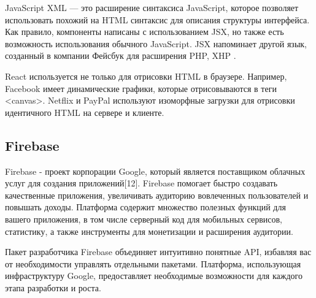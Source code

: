 JavaScript XML — это расширение синтаксиса JavaScript, которое позволяет использовать похожий на HTML синтаксис для описания структуры интерфейса.
Как правило, компоненты написаны с использованием JSX, но также есть возможность использования обычного JavaScript.
JSX напоминает другой язык, созданный в компании Фейсбук для расширения PHP, XHP .

React используется не только для отрисовки HTML в браузере.
Например, Facebook имеет динамические графики, которые отрисовываются в теги <canvas>.
Netflix и PayPal используют изоморфные загрузки для отрисовки идентичного HTML на сервере и клиенте.

\subsection{Firebase}
Firebase - проект корпорации Google, который является поставщиком облачных услуг для создания приложений[12].
Firebase помогает быстро создавать качественные приложения, увеличивать аудиторию вовлеченных пользователей и повышать доходы.
Платформа содержит множество полезных функций для вашего приложения, в том числе серверный код для мобильных сервисов, статистику, а также инструменты для монетизации и расширения аудитории.

Пакет разработчика Firebase объединяет интуитивно понятные API, избавляя вас от необходимости управлять отдельными пакетами.
Платформа, использующая инфраструктуру Google, предоставляет необходимые возможности для каждого этапа разработки и роста.

